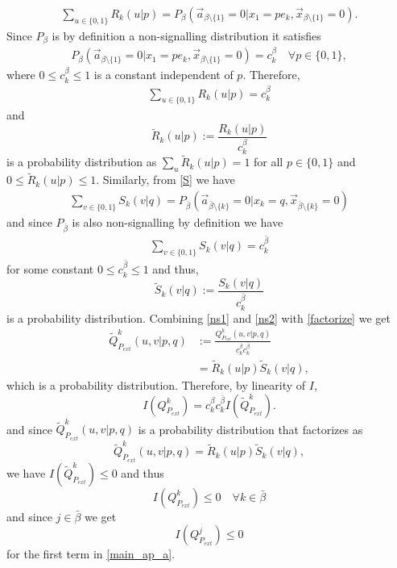 \documentclass[pra,aps,reprint,superscriptaddress]{revtex4-2}
\theoremstyle{theorem}
\begin{document}
\begin{align}
    \sum_{u\in\{0,1\}}R_k(u|p) = P_{\beta}\left( \vec a_{\beta \setminus \{1\}}=0|x_1=pe_k,\vec x_{\beta \setminus \{1\}}=0\right). 
\end{align}
Since $P_\beta$ is by definition a non-signalling distribution it satisfies
\begin{align}
    P_{\beta}\left( \vec a_{\beta \setminus \{1\}}=0|x_1=pe_k,\vec x_{\beta \setminus \{1\}}=0\right)=c^{\beta}_k \quad \forall p\in\{0,1\},
\end{align}
where $0\leq c^{\beta}_k \leq 1$ is a constant independent of $p$. Therefore,
\begin{align}
    \sum_{u\in\{0,1\}}R_k(u|p) = c_k^{\beta}
\end{align}
and 
\begin{equation}\label{ns1}
    \tilde R_k(u|p) := \frac{R_k(u|p)}{c_k^{\beta}}
\end{equation}
is a probability distribution as $\sum_{u}\tilde R_k(u|p)=1$ for all $p\in\{0,1\}$ and $0\leq \tilde R_k(u|p) \leq 1$. Similarly, from \eqref{S} we have
\begin{align}
    \sum_{v\in\{0,1\}}S_k(v|q)=P_{\bar \beta}\left(\vec a_{\bar \beta \setminus \{k\}}=0|x_k=q,\vec x_{\bar \beta \setminus \{k\}}=0\right)
\end{align}
and since $P_{\bar \beta}$ is also non-signalling by definition we have 
\begin{align}
    \sum_{v\in\{0,1\}}S_k(v|q) = c_k^{\bar \beta}
\end{align}
for some constant $0\leq c_k^{\bar \beta}\leq 1$ and thus,
\begin{equation}\label{ns2}
    \tilde S_k(v|q) := \frac{S_k(v|q)}{c_k^{\bar \beta}}
\end{equation}
is a probability distribution. Combining \eqref{ns1} and \eqref{ns2} with \eqref{factorize} we get
\begin{align}
    \tilde Q^k_{P_{ext}}(u,v|p,q)&:=\frac{Q^k_{P_{ext}}(u,v|p,q)}{c_k^{ \beta}c_k^{\bar \beta}} \\
    &=\tilde R_k(u|p)\tilde S_k(v|q),
\end{align}
which is a probability distribution. Therefore, by linearity of $I$,
\begin{equation}
I\left(Q^k_{P_{ext}}\right)=c_k^{ \beta}c_k^{\bar \beta}I\left(\tilde Q^k_{P_{ext}}\right).
\end{equation}
and since $\tilde Q^k_{P_{ext}}(u,v|p,q)$ is a probability distribution that factorizes as
\begin{equation}
\tilde Q^k_{P_{ext}}(u,v|p,q) = \tilde R_k(u|p)\tilde S_k(v|q),
\end{equation}
we have $I\left(\tilde Q^k_{P_{ext}}\right)\leq 0$ and thus 
\begin{equation}\label{first_third}
I\left( Q^k_{P_{ext}}\right)\leq 0\quad \forall k\in \bar\beta
\end{equation}
and since $j\in\bar \beta$ we get
\begin{equation}\label{first_sum}
    I\left( Q^j_{P_{ext}}\right)\leq 0
\end{equation}
for the first term in \eqref{main_ap_a}. 
\end{document}
